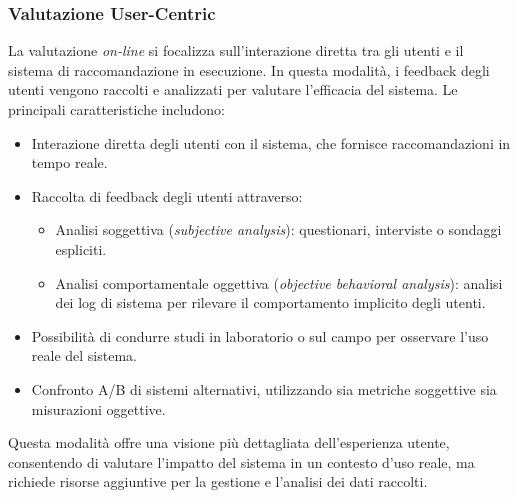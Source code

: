 \documentclass{report}
\begin{document}
	\subsubsection{Valutazione User-Centric}
	La valutazione \textit{on-line} si focalizza sull'interazione diretta tra gli utenti e il sistema di raccomandazione in esecuzione. In questa modalità, i feedback degli utenti vengono raccolti e analizzati per valutare l'efficacia del sistema. Le principali caratteristiche includono:
	\begin{itemize}
		\item Interazione diretta degli utenti con il sistema, che fornisce raccomandazioni in tempo reale.
		\item Raccolta di feedback degli utenti attraverso:
		\begin{itemize}
			\item Analisi soggettiva (\textit{subjective analysis}): questionari, interviste o sondaggi espliciti.
			\item Analisi comportamentale oggettiva (\textit{objective behavioral analysis}): analisi dei log di sistema per rilevare il comportamento implicito degli utenti.
		\end{itemize}
		\item Possibilità di condurre studi in laboratorio o sul campo per osservare l’uso reale del sistema.
		\item Confronto A/B di sistemi alternativi, utilizzando sia metriche soggettive sia misurazioni oggettive.
	\end{itemize}
	Questa modalità offre una visione più dettagliata dell’esperienza utente, consentendo di valutare l’impatto del sistema in un contesto d’uso reale, ma richiede risorse aggiuntive per la gestione e l’analisi dei dati raccolti.
\end{document}
